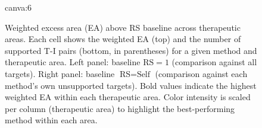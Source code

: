 \begin{figure}[t!]
    \centering
    {{canva:6}}
    \caption{Weighted excess area (EA) above RS baseline across therapeutic areas. Each cell shows the weighted EA (top) and the number of supported T-I pairs (bottom, in parentheses) for a given method and therapeutic area. Left panel: baseline $\text{RS} = 1$ (comparison against all targets). Right panel: baseline $\text{RS} = \text{Self}$ (comparison against each method's own unsupported targets). Bold values indicate the highest weighted EA within each therapeutic area. Color intensity is scaled per column (therapeutic area) to highlight the best-performing method within each area.}
    \label{fig:weighted-ea}
\end{figure}

